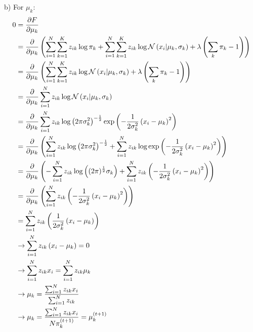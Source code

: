 b) For $\mu_k$:\\
\begin{align*}
0 &= \frac{\partial F}{\partial \mu_k}\\
&=  \frac{\partial}{\partial \mu_k} \left( \sum_{i=1}^N \sum_{k=1}^K z_{ik}\log \pi_k +
	\sum_{i=1}^N \sum_{k=1}^K z_{ik} \log \mathcal{N}\left(x_i | \mu_k, \sigma_k \right)
	 + \lambda \left( \sum_k \pi_k - 1 \right) \right)\\
&= \frac{\partial}{\partial \mu_k} \left( 
	\sum_{i=1}^N \sum_{k=1}^K z_{ik} \log \mathcal{N}\left(x_i | \mu_k, \sigma_k \right)
	 + \lambda \left( \sum_k \pi_k - 1 \right) \right)\\
&= \frac{\partial}{\partial \mu_k}
	\sum_{i=1}^N z_{ik} \log \mathcal{N}\left(x_i | \mu_k, \sigma_k \right)\\
&=  \frac{\partial}{\partial \mu_k}
	\sum_{i=1}^N z_{ik} \log \left(2\pi \sigma_k^2\right)^{-\frac{1}{2}} \exp \left( -\frac{1}{2\sigma_k^2} \left( x_i - \mu_k \right)^2 \right)\\
&=  \frac{\partial}{\partial \mu_k} \left(
	\sum_{i=1}^N z_{ik} \log \left(2\pi \sigma_k^2\right)^{-\frac{1}{2}} +
	\sum_{i=1}^N z_{ik}  \log \exp \left(
			-\frac{1}{2\sigma_k^2} \left( x_i - \mu_k \right)^2
		\right)
\right)\\
&=  \frac{\partial}{\partial \mu_k} \left(
	-\sum_{i=1}^N z_{ik} \log \left((2\pi)^{\frac{1}{2}} \sigma_k\right) +
	\sum_{i=1}^N z_{ik}  \left(
			-\frac{1}{2\sigma_k^2} \left( x_i - \mu_k \right)^2
		\right)
\right)\\
&=  \frac{\partial}{\partial \mu_k} \left(
	\sum_{i=1}^N z_{ik}  \left(
			-\frac{1}{2\sigma_k^2} \left( x_i - \mu_k \right)^2
		\right)
\right)\\
&= \sum_{i=1}^N z_{ik}  \left(
	\frac{1}{2\sigma_k^2} \left( x_i - \mu_k \right)
\right)\\
& \rightarrow \sum_{i=1}^N z_{ik}  \left( x_i - \mu_k \right) = 0\\
& \rightarrow \sum_{i=1}^N z_{ik} x_i = \sum_{i=1}^N z_{ik} \mu_k\\
& \rightarrow \mu_k = \frac{\sum_{i=1}^N z_{ik} x_i}{\sum_{i=1}^N z_{ik}}\\
& \rightarrow \mu_k =  \frac{\sum_{i=1}^N z_{ik} x_i}{N \pi_k^{(t+1)}} = \mu_k^{(t+1)}\\
\end{align*}

\pagebreak

